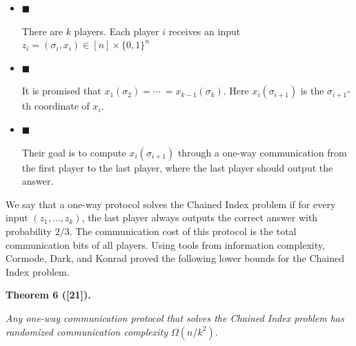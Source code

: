 \begin{itemize}


\item[] 
$\blacksquare$ 


There are $k$ players. Each player $i$ receives an input $z_{i}=(\sigma_{i},x_{i})\in[n]\times\{0,1\}^{n}$\par





\item[] 
$\blacksquare$ 


It is promised that $x_{1}(\sigma_{2})=\cdots\ =x_{k-1}(\sigma_{k}).$ Here $x_{i}(\sigma_{i+1})$ is the $\sigma_{i+1}$-th coordinate of $x_{i}$.\par





\item[] 
$\blacksquare$ 


Their goal is to compute $x_{i}(\sigma_{i+1})$ through a one-way communication from the first player to the last player, where the last player should output the answer.\par





\end{itemize}


We say that a one-way protocol solves the Chained Index problem if for every input $(z_{1},\dots,z_{k})$, the last player always outputs the correct answer with probability $2/3$. The communication cost of this protocol is the total communication bits of all players. Using tools from information complexity, Cormode, Dark, and Konrad proved the following lower bounds for the Chained Index problem.\par





\par\medskip\noindent\textbf{
\textbf{Theorem 6}\textbf{ }([21])\textbf{.}
}\par



\emph{Any one-way communication protocol that solves the Chained Index problem has randomized communication complexity $\Omega(n/k^{2}).$}\par






